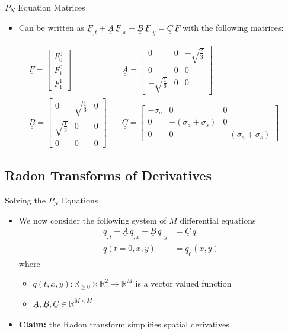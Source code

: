 \documentclass{beamer}
\newcommand{\bunderline}[1]{\underline{#1}}
\renewcommand{\vec}[1]{{\bunderline{#1}}}
\newcommand{\mat}[1]{{\bunderline{\bunderline{#1}}}}
\begin{document}
\begin{frame}{$P_N$ Equation Matrices}
	\begin{itemize}
		\item
		Can be written as $\vec{F}_{,t} + \mat{A}\, \vec{F}_{,x} + \mat{B} \, \vec{F}_{,y} = \mat{C} \, \vec{F}$ with the following matrices:
	\end{itemize}
	\begin{align*}
	\vec{F} = 
	\begin{bmatrix}
	F_0^0 \\
	F_1^0 \\
	F_1^1
	\end{bmatrix} \quad
	&\mat{A} = 
	\begin{bmatrix}
	0 & 0 & -\sqrt{\frac{2}{3}} \\
	0 & 0 & 0 \\
	-\sqrt{\frac{1}{6}} & 0 & 0
	\end{bmatrix} \\
	\mat{B} = 
	\begin{bmatrix}
	0 & \sqrt{\frac{1}{3}} & 0 \\
	\sqrt{\frac{1}{3}} & 0 & 0 \\
	0 & 0 & 0
	\end{bmatrix} \quad
	&\mat{C} = 
	\begin{bmatrix}
	-\sigma_a & 0 & 0 \\
	0 & -(\sigma_a + \sigma_s) & 0 \\
	0 & 0 & -(\sigma_a + \sigma_s)
	\end{bmatrix}
	\end{align*}
\end{frame}

\subsection{Radon Transforms of Derivatives}
\begin{frame}{Solving the $P_N$ Equations}
	\begin{itemize}
		\item
		We now consider the following system of $M$ differential equations
		\begin{align*}
		\vec{q}_{,t} + \mat{A}\,\vec{q}_{,x} + \mat{B}\,\vec{q}_{,y} & = \mat{C}\,\vec{q} \\
		\vec{q}(t = 0, x, y) & = \vec{q}_{0}(x, y)
		\end{align*}
		where
		\begin{itemize}
			\item $q(t, x, y): \mathbb{R}_{\geq 0} \times \mathbb{R}^{2} \rightarrow \mathbb{R}^{M}$ is a vector valued function
			\item $\mat{A}, \mat{B}, \mat{C} \in \mathbb{R}^{M \times M}$
		\end{itemize}
		\vspace{0.5cm}
		\item \textbf{Claim:} the Radon transform simplifies spatial derivatives
	\end{itemize}   
\end{frame}
\end{document}

